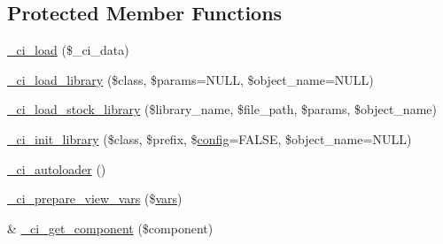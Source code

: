\subsection*{Protected Member Functions}
\begin{DoxyCompactItemize}
\item 
\mbox{\hyperlink{class_c_i___loader_ae3b5045c81f69c90afc7e918ff664d37}{\+\_\+ci\+\_\+load}} (\$\+\_\+ci\+\_\+data)
\item 
\mbox{\hyperlink{class_c_i___loader_a5ee20a37e1d55db949084f2f5563d2d2}{\+\_\+ci\+\_\+load\+\_\+library}} (\$class, \$params=N\+U\+LL, \$object\+\_\+name=N\+U\+LL)
\item 
\mbox{\hyperlink{class_c_i___loader_aa7c2bf48ad1c415720cd219e23f2d6e2}{\+\_\+ci\+\_\+load\+\_\+stock\+\_\+library}} (\$library\+\_\+name, \$file\+\_\+path, \$params, \$object\+\_\+name)
\item 
\mbox{\hyperlink{class_c_i___loader_a20ac1358ec26e9951959f26e2c5ca121}{\+\_\+ci\+\_\+init\+\_\+library}} (\$class, \$prefix, \$\mbox{\hyperlink{class_c_i___loader_af54799dcb5bf2f7346b5d2a7d824a471}{config}}=F\+A\+L\+SE, \$object\+\_\+name=N\+U\+LL)
\item 
\mbox{\hyperlink{class_c_i___loader_a93471c04ea0689dcf8faa5903d201efe}{\+\_\+ci\+\_\+autoloader}} ()
\item 
\mbox{\hyperlink{class_c_i___loader_a0b50441cbf6aa13ff52df0297e03af29}{\+\_\+ci\+\_\+prepare\+\_\+view\+\_\+vars}} (\$\mbox{\hyperlink{class_c_i___loader_a6fb4bfc8364ff6b8e4dc137faa36232a}{vars}})
\item 
\& \mbox{\hyperlink{class_c_i___loader_a189d7f497e55c20fb9f82b065c20e402}{\+\_\+ci\+\_\+get\+\_\+component}} (\$component)
\end{DoxyCompactItemize}

